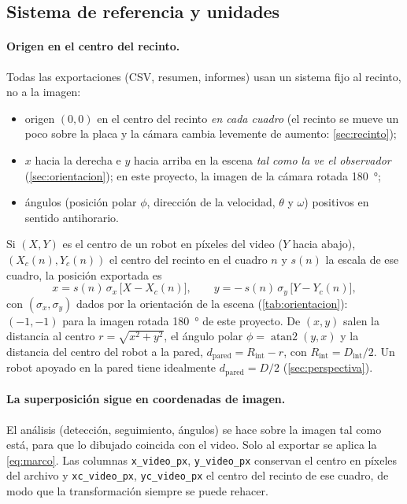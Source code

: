 \subsection{Sistema de referencia y unidades}\label{sec:referencia}

\paragraph{Origen en el centro del recinto.} Todas las exportaciones (CSV, resumen, informes) usan un
sistema fijo al recinto, no a la imagen:
\begin{itemize}
  \item origen $(0,0)$ en el centro del recinto \emph{en cada cuadro} (el recinto se mueve un poco sobre
        la placa y la cámara cambia levemente de aumento: \cref{sec:recinto});
  \item $x$ hacia la derecha e $y$ hacia arriba en la escena \emph{tal como la ve el observador}
        (\cref{sec:orientacion}); en este proyecto, la imagen de la cámara rotada \SI{180}{\degree};
  \item ángulos (posición polar $\phi$, dirección de la velocidad, $\theta$ y $\omega$) positivos en
        sentido antihorario.
\end{itemize}
Si $(X, Y)$ es el centro de un robot en píxeles del video ($Y$ hacia abajo), $(X_c(n), Y_c(n))$ el
centro del recinto en el cuadro $n$ y $s(n)$ la escala de ese cuadro, la posición exportada es
\begin{equation}
  x = s(n)\,\sigma_x\,\bigl[X - X_c(n)\bigr],\qquad
  y = -\,s(n)\,\sigma_y\,\bigl[Y - Y_c(n)\bigr],
  \label{eq:marco}
\end{equation}
con $(\sigma_x, \sigma_y)$ dados por la orientación de la escena (\cref{tab:orientacion}): $(-1,-1)$
para la imagen rotada \SI{180}{\degree} de este proyecto. De
$(x,y)$ salen la distancia al centro $r = \sqrt{x^2+y^2}$, el ángulo polar $\phi = \operatorname{atan2}(y,x)$
y la distancia del centro del robot a la pared, $d_{\mathrm{pared}} = R_{\mathrm{int}} - r$, con
$R_{\mathrm{int}} = D_{\mathrm{int}}/2$. Un robot apoyado en la pared tiene idealmente
$d_{\mathrm{pared}} = D/2$ (\cref{sec:perspectiva}).

\paragraph{La superposición sigue en coordenadas de imagen.} El análisis (detección, seguimiento,
ángulos) se hace sobre la imagen tal como está, para que lo dibujado coincida con el video. Solo al
exportar se aplica la \cref{eq:marco}. Las columnas \texttt{x\_video\_px}, \texttt{y\_video\_px}
conservan el centro en píxeles del archivo y \texttt{xc\_video\_px}, \texttt{yc\_video\_px} el centro del
recinto de ese cuadro, de modo que la transformación siempre se puede rehacer.

